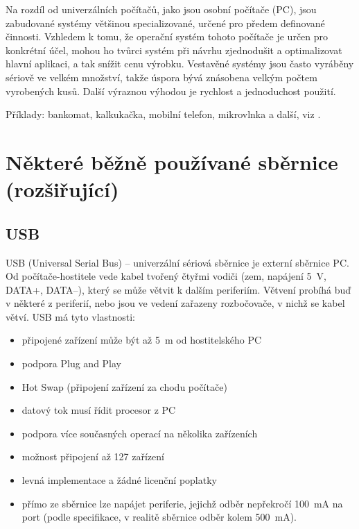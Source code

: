 \documentclass[12pt]{article}
\begin{document}
Na rozdíl od univerzálních počítačů, jako jsou osobní počítače (PC), jsou zabudované systémy většinou specializované, určené pro předem definované činnosti. 
Vzhledem k tomu, že operační systém tohoto počítače je určen pro konkrétní účel, 
mohou ho tvůrci systém při návrhu zjednodušit a optimalizovat hlavní aplikaci, a tak snížit cenu výrobku. 
Vestavěné systémy jsou často vyráběny sériově ve velkém množství, takže úspora bývá znásobena velkým počtem vyrobených kusů.
Další výraznou výhodou je rychlost a jednoduchost použití.

Příklady: bankomat, kalkukačka, mobilní telefon, mikrovlnka a další, viz \cite{embedded}.


 \section{Některé běžně používané sběrnice (rozšiřující) }  \label{prehled_sbernic}
 
  \subsection{USB}
  
  USB (Universal Serial Bus) -- univerzální sériová sběrnice je externí sběrnice PC.
    Od počítače-hostitele vede kabel tvořený čtyřmi vodiči (zem, napájení 5~V, DATA+, DATA--), který se může větvit k dalším periferiím. Větvení probíhá buď v některé z periferií, nebo jsou ve vedení zařazeny rozbočovače, v nichž se kabel větví. USB má tyto vlastnosti:
    \begin{itemize}
    	\item připojené zařízení může být až 5~m od hostitelského PC
    	\item podpora Plug and Play
    	\item Hot Swap (připojení zařízení za chodu počítače)
    	\item datový tok musí řídit procesor z PC
    	\item podpora více současných operací na několika zařízeních
    	\item možnost připojení až 127 zařízení
    	\item levná implementace a žádné licenční poplatky	
    	\item přímo ze sběrnice lze napájet periferie, jejichž odběr nepřekročí 100~mA na port (podle specifikace, v realitě sběrnice  odběr kolem 500~mA).
    	
    \end{itemize}
 
\end{document}
